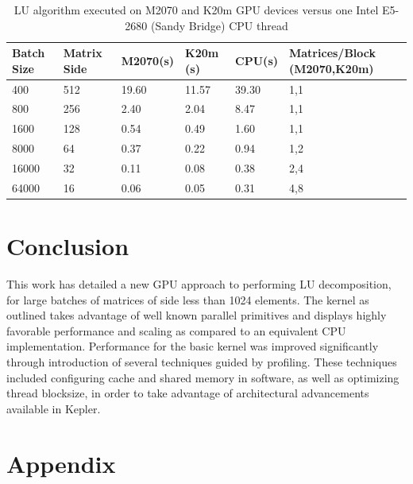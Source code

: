 \documentclass[letter, 12pt]{article}
\begin{document}
\begin{centering}
\begin{table}[h!]
\caption{LU algorithm executed on M2070 and K20m GPU devices versus one Intel E5-2680 (Sandy Bridge) CPU thread}
\begin{tabular}{llllll}
Batch Size & Matrix Side &	M2070(s) & K20m (s) & CPU(s) & Matrices/Block \newline (M2070,K20m) \\
\hline
400 &	512 &	19.60 	& 	11.57 	&	39.30 	&	1,1 \\
800 &	256 &	2.40 	&	2.04 	&	8.47 	&	1,1 \\
1600 &	128 &	0.54 	&	0.49 	&	1.60 	&	1,1 \\
8000 &	64 &	0.37 	&	0.22 	&	0.94 	&	1,2 \\
16000 &	32 &	0.11 	&	0.08 	&	0.38 	&	2,4 \\
64000 &	16 &	0.06 	&	0.05 	&	0.31 	&	4,8 \\
\hline

\end{tabular}

\end{table}
\end{centering}

\section{Conclusion}

This work has detailed a new GPU approach to performing LU decomposition, for large batches of matrices of side less than 1024 elements. The kernel as outlined takes advantage of well known parallel primitives and displays highly favorable performance and scaling as compared to an equivalent CPU implementation. Performance for the basic kernel was improved significantly through introduction of several techniques guided by profiling. These techniques included configuring cache and shared memory in software, as well as optimizing thread blocksize, in order to take advantage of architectural advancements available in Kepler. 


\section*{Appendix}
\end{document}
